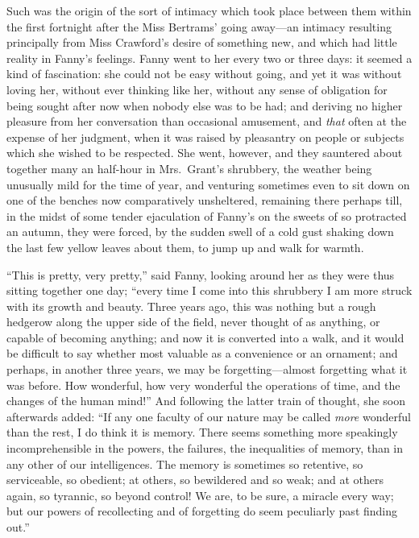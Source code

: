 \documentclass{article}
\begin{document}
Such was the origin of the sort of intimacy which took
place between them within the first fortnight after
the Miss Bertrams' going away---an intimacy resulting
principally from Miss Crawford's desire of something new,
and which had little reality in Fanny's feelings.
Fanny went to her every two or three days:  it seemed a kind
of fascination:  she could not be easy without going,
and yet it was without loving her, without ever thinking
like her, without any sense of obligation for being
sought after now when nobody else was to be had;
and deriving no higher pleasure from her conversation
than occasional amusement, and \emph{that} often at the expense
of her judgment, when it was raised by pleasantry on
people or subjects which she wished to be respected.
She went, however, and they sauntered about together
many an half-hour in Mrs.\ Grant's shrubbery, the weather
being unusually mild for the time of year, and venturing
sometimes even to sit down on one of the benches now
comparatively unsheltered, remaining there perhaps till,
in the midst of some tender ejaculation of Fanny's on
the sweets of so protracted an autumn, they were forced,
by the sudden swell of a cold gust shaking down the last few
yellow leaves about them, to jump up and walk for warmth.

``This is pretty, very pretty,'' said Fanny, looking around
her as they were thus sitting together one day; ``every time
I come into this shrubbery I am more struck with its
growth and beauty.  Three years ago, this was nothing
but a rough hedgerow along the upper side of the field,
never thought of as anything, or capable of becoming anything;
and now it is converted into a walk, and it would be
difficult to say whether most valuable as a convenience
or an ornament; and perhaps, in another three years,
we may be forgetting---almost forgetting what it was before.
How wonderful, how very wonderful the operations of time,
and the changes of the human mind!''  And following
the latter train of thought, she soon afterwards added:
``If any one faculty of our nature may be called \emph{more}
wonderful than the rest, I do think it is memory.
There seems something more speakingly incomprehensible
in the powers, the failures, the inequalities
of memory, than in any other of our intelligences.
The memory is sometimes so retentive, so serviceable,
so obedient; at others, so bewildered and so weak;
and at others again, so tyrannic, so beyond control!
We are, to be sure, a miracle every way; but our powers
of recollecting and of forgetting do seem peculiarly past
finding out.''
\end{document}

